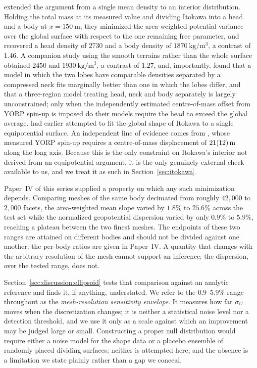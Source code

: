 \citet{kanamaru2019} extended the argument from a single mean density to
an interior distribution. Holding the total mass at its measured value
and dividing Itokawa into a head and a body at $x=\SI{150}{\metre}$,
they minimized the area-weighted potential variance over the global
surface with respect to the one remaining free parameter, and recovered
a head density of $2730$ and a body density of
$\SI{1870}{\kilo\gram\per\cubic\metre}$, a contrast of $1.46$. A
companion study using the smooth terrains rather than the whole surface
\citep{kanamaru2019pss} obtained $2450$ and
$\SI{1930}{\kilo\gram\per\cubic\metre}$, a contrast of $1.27$, and,
importantly, found that a model in which the two lobes have comparable
densities separated by a compressed neck fits marginally better than one
in which the lobes differ, and that a three-region model treating head,
neck and body separately is largely unconstrained; only when the
independently estimated centre-of-mass offset from YORP spin-up is
imposed do their models require the head to exceed the global average.
\citet{motooka2012} had earlier attempted to fit the global shape of
Itokawa to a single equipotential surface. An independent line of
evidence comes from \citet{lowry2014}, whose measured YORP spin-up
requires a centre-of-mass displacement of
$\SI{21\pm12}{\metre}$ along the long axis. Because this is the only
constraint on Itokawa's interior not derived from an equipotential
argument, it is the only genuinely external check available to us, and
we treat it as such in Section~\ref{sec:itokawa}.

Paper~IV of this series supplied a property on which any such
minimization depends. Comparing meshes of the same body decimated from
roughly $42{,}000$ to $2{,}000$ facets, the area-weighted mean slope
varied by $1.8\%$ to $25.6\%$ across the test set while the normalized
geopotential dispersion varied by only $0.9\%$ to $5.9\%$, reaching a
plateau between the two finest meshes. The endpoints of these two ranges
are attained on different bodies and should not be divided against one
another; the per-body ratios are given in Paper~IV. A quantity that
changes with the arbitrary resolution of the mesh cannot support an
inference; the dispersion, over the tested range, does not.

Section~\ref{sec:discussion:ellipsoid} tests that comparison against an
analytic reference and finds it, if anything, understated. We refer to
the $0.9$--$5.9\%$ range throughout as the \emph{mesh-resolution
sensitivity envelope}. It measures how far $\tilde{\sigma}_{U}$ moves when the
discretization changes; it is neither a statistical noise level nor a
detection threshold, and we use it only as a scale against which an
improvement may be judged large or small. Constructing a proper null
distribution would require either a noise model for the shape data or a
placebo ensemble of randomly placed dividing surfaces; neither is
attempted here, and the absence is a limitation we state plainly rather
than a gap we conceal.

